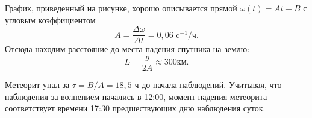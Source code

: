 \begin{multicols}{2}
График, приведенный на рисунке, хорошо описывается прямой $\omega(t) = At + B$ с угловым коэффициентом 
$$A = \frac{\Delta \omega}{\Delta t} = 0,06 \textrm{ c}^{-1}/\textrm{ч}.$$
Отсюда находим расстояние до места падения спутника на землю:
$$L = \frac{g}{2A} \approx 300 \textrm{км.}$$

Метеорит упал за $\tau = B/A = 18,5$ ч до начала наблюдений. Учитывая, что наблюдения за волнением начались в 12:00, момент падения метеорита соответствует времени 17:30 предшествующих дню наблюдения суток.

\end{multicols}

\begin{box}
  \centering
\end{box}

